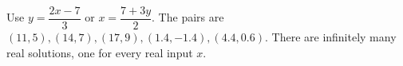 Use $y=\dfrac{2x-7}{3}$ or $x=\dfrac{7+3y}{2}$. The pairs are $\boxed{(11,5),(14,7),(17,9),(1.4,-1.4),(4.4,0.6)}$. There are infinitely many real solutions, one for every real input $x$.

